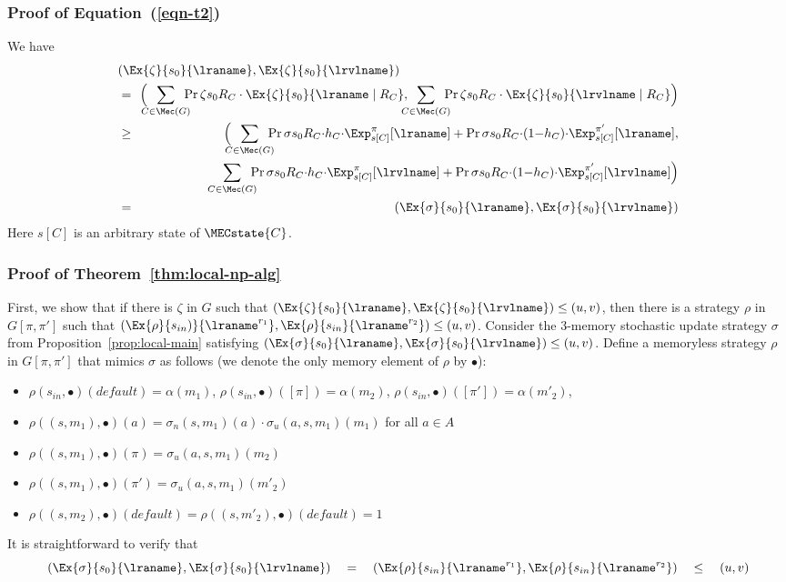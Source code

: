\subsubsection{Proof of Equation~(\ref{eqn-t2})}\label{app-eqn-t2}
We have
\begin{eqnarray*}
\lefteqn{(\Ex{\zeta}{s_0}{\lraname},\Ex{\zeta}{s_0}{\lrvlname}) }\\& = & \!\!\Big(\!\!\!\!\sum_{C\in \Mec(G)}\!\!\!\! \Pr{\zeta}{s_0}{R_C}\cdot \Ex{\zeta}{s_0}{\lraname\mid R_C},
   \!\!\!\!\sum_{C\in \Mec(G)}\!\!\!\! \Pr{\zeta}{s_0}{R_C}\cdot \Ex{\zeta}{s_0}{\lrvlname\mid R_C}\Big) \\
  & \geq  & \!\!\Big(\!\!\!\!\sum_{C\in \Mec(G)}\!\!\!\! \Pr{\sigma}{s_0}{R_C}{\cdot} h_C {\cdot} \Exp^{\pi}_{s[C]}[\lraname] + 
 \Pr{\sigma}{s_0}{R_C}{\cdot} (1{-}h_C) {\cdot} \Exp^{\pi'}_{s[C]}[\lraname], \\
  & &\; \sum_{C\in \Mec(G)}\!\!\!\! \Pr{\sigma}{s_0}{R_C}{\cdot} h_C {\cdot} \Exp^{\pi}_{s[C]}[\lrvlname] + 
 \Pr{\sigma}{s_0}{R_C}{\cdot} (1{-}h_C) {\cdot} \Exp^{\pi'}_{s[C]}[\lrvlname]\Big)\\
  & = &\!\! (\Ex{\sigma}{s_0}{\lraname},\Ex{\sigma}{s_0}{\lrvlname})
\end{eqnarray*}
Here $s[C]$ is an arbitrary state of $\MECstate{C}$.
\subsubsection{Proof of Theorem~\ref{thm:local-np-alg}}\label{app-local-np-alg}
First, we show that if there is $\zeta$ in $G$ such that
$(\Ex{\zeta}{s_0}{\lraname}, \Ex{\zeta}{s_0}{\lrvlname})\leq (u,v)$, then there is a strategy $\rho$ in $G[\pi,\pi']$ such that $(\Ex{\rho}{s_{in})}{\lraname^{r_1}},\Ex{\rho}{s_{in}}{\lraname^{r_2}})\leq (u,v)$. 
Consider the 3-memory stochastic update strategy $\sigma$ from Proposition~\ref{prop:local-main} satisfying
$(\Ex{\sigma}{s_0}{\lraname}, \Ex{\sigma}{s_0}{\lrvlname})\leq (u,v)$. Define a memoryless strategy $\rho$ in $G[\pi,\pi']$ that mimics $\sigma$ as follows (we denote the only memory element of $\rho$ by $\bullet$):
\begin{itemize}
\item $\rho(s_{in},\bullet)(\mathit{default}) = \alpha(m_1)$,  $\rho(s_{in},\bullet)([\pi]) = \alpha(m_2)$, $\rho(s_{in},\bullet)([\pi']) = \alpha(m'_2)$,
\item $\rho((s,m_1),\bullet)(a)=\sigma_n(s,m_1)(a)\cdot \sigma_u(a,s,m_1)(m_1)$  for all $a\in A$
\item $\rho((s,m_1),\bullet)(\pi)=\sigma_u(a,s,m_1)(m_2)$
\item $\rho((s,m_1),\bullet)(\pi')=\sigma_u(a,s,m_1)(m'_2)$
\item $\rho((s,m_2),\bullet)(\mathit{default})=\rho((s,m'_2),\bullet)(\mathit{default})=1$
\end{itemize}
It is straightforward to verify that 
\[
(\Ex{\sigma}{s_0}{\lraname}, \Ex{\sigma}{s_0}{\lrvlname})\quad = \quad (\Ex{\rho}{s_{in}}{\lraname^{r_1}}, \Ex{\rho}{s_{in}}{\lraname^{r_2}})\quad \leq \quad (u,v)
\]


